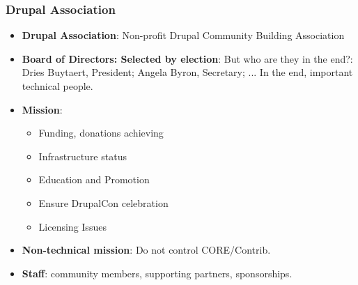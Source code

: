 \begin{frame}[allowframebreaks]
\frametitle{Drupal Association}

\begin{itemize}
\item \textbf{Drupal Association}: Non-profit Drupal Community Building Association
\item \textbf{Board of Directors: Selected by election}: But who are they in the end?:
Dries Buytaert, President; Angela Byron, Secretary; ...
In the end, important technical people.
\item \textbf{Mission}:
\begin{itemize}
\item Funding, donations achieving
\item Infrastructure status
\item Education and Promotion
\item Ensure DrupalCon celebration
\item Licensing Issues
\end{itemize}
\item \textbf{Non-technical mission}: Do not control CORE/Contrib.
\item \textbf{Staff}: community members, supporting partners, sponsorships.
\end{itemize}
\end{frame}
